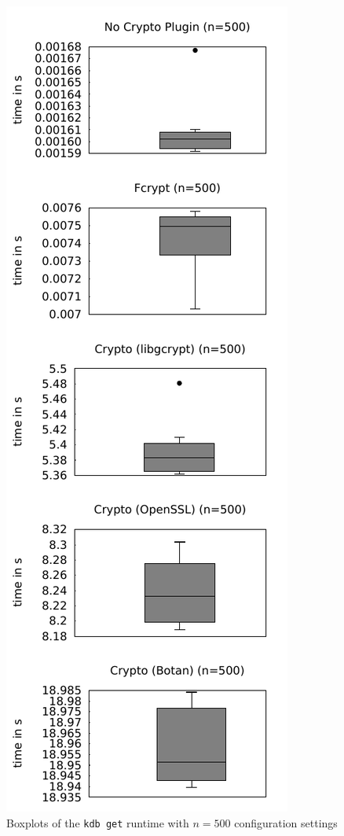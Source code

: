 \begin{figure}[h]
\center
\caption{Boxplots of the \texttt{kdb get} runtime with $n = 500$ configuration settings}
\label{eval-boxplot-get}
\includegraphics{plots/boxplot_500_get.pdf}
\end{figure}


